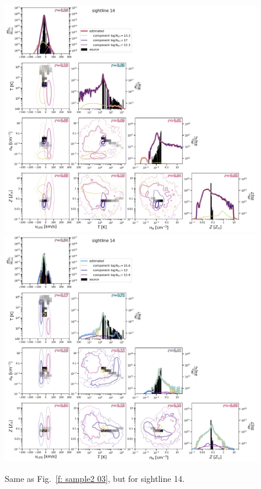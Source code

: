 \documentclass[fleqn,usenatbib]{mnras}
\begin{document}
\begin{figure}
    \centering
    \includegraphics[height=0.45\textheight]{figures/sample2/original/sightline_0014.png}
    \includegraphics[height=0.45\textheight]{figures/sample2/high-z/sightline_0014.png}
    \label{f: sample2 14 corner}
    \caption{Same as Fig.~\ref{f: sample2 03}, but for sightline 14.}
\end{figure}
\end{document}
